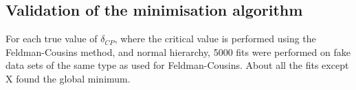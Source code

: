 \clearpage

\subsection{Validation of the minimisation algorithm}
\label{sec:minim_algorithm_run17c}

For each true value of $\delta_{CP}$, where the critical value is performed using the Feldman-Cousins method,
and normal hierarchy, 5000 fits were performed on fake data sets of the same type as used for Feldman-Cousins.
About all the fits except X found the global minimum.



\clearpage
